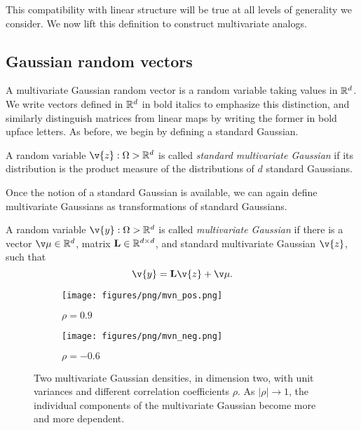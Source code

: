\documentclass[11pt]{book}
\begin{document}
This compatibility with linear structure will be true at all levels of generality we consider.
We now lift this definition to construct multivariate analogs.

\subsection{Gaussian random vectors}

A multivariate Gaussian random vector is a random variable taking values in $\mathbb{R}^d$.
We write vectors defined in $\mathbb{R}^d$ in bold italics to emphasize this distinction, and similarly distinguish matrices from linear maps by writing the former in bold upface letters.
As before, we begin by defining a standard Gaussian.

\begin{definition}
A random variable $\v{z} : \Omega\->\R^d$ is called \emph{standard multivariate Gaussian} if its distribution is the product measure of the distributions of $d$ standard Gaussians.
\end{definition}

Once the notion of a standard Gaussian is available, we can again define multivariate Gaussians as transformations of standard Gaussians.

\begin{definition}
A random variable $\v{y} : \Omega\->\R^d$ is called \emph{multivariate Gaussian} if there is a vector $\v\mu\in\R^d$, matrix $\m{L}\in\R^{d\x d}$, and standard multivariate Gaussian $\v{z}$, such that
\[
\v{y} = \m{L}\v{z} + \v\mu
.
\]
\end{definition}


\begin{figure}
\begin{subfigure}{0.49\textwidth}
\texttt{[image: figures/png/mvn\_pos.png]}
\caption{$\rho = 0.9$}
\end{subfigure}
\begin{subfigure}{0.49\textwidth}
\texttt{[image: figures/png/mvn\_neg.png]}
\caption{$\rho = -0.6$}
\end{subfigure}
\caption[Multivariate Gaussian densities]{Two multivariate Gaussian densities, in dimension two, with unit variances and different correlation coefficients $\rho$. As $|\rho| \to 1$, the individual components of the multivariate Gaussian become more and more dependent.}
\label{fig:mvn-density}
\end{figure}
\end{document}
